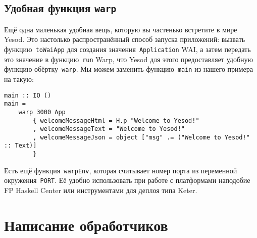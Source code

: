\subsection{Удобная функция \texttt{warp}}
Ещё одна маленькая удобная вещь, которую вы частенько встретите в мире Yesod.
Это настолько распространённый способ запуска приложений: вызвать
функцию~\lstinline'toWaiApp' для создания значения~\lstinline'Application' WAI,
а затем передать это значение в функцию~\lstinline'run' Warp, что Yesod для
этого предоставляет удобную функцию-обёртку~\lstinline'warp'. Мы можем заменить
функцию~\lstinline'main' из нашего примера на такую:
\begin{lstlisting}
main :: IO ()
main =
    warp 3000 App
        { welcomeMessageHtml = H.p "Welcome to Yesod!"
        , welcomeMessageText = "Welcome to Yesod!"
        , welcomeMessageJson = object ["msg" .= ("Welcome to Yesod!" :: Text)]
        }
\end{lstlisting}

Есть ещё функция~\lstinline'warpEnv', которая считывает номер порта из
переменной окружения~\lstinline'PORT'. Её удобно использовать при работе с
платформами наподобие FP Haskell Center или инструментами для деплоя типа
Keter.

\section{Написание обработчиков}
